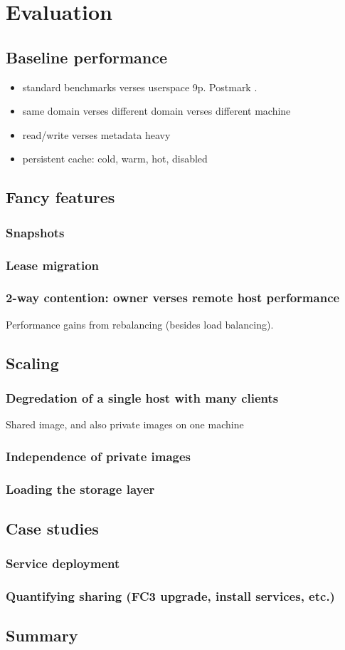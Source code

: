 \chapter{Evaluation}

\section{Baseline performance}
\begin{itemize}
\item standard benchmarks verses userspace 9p. Postmark \cite{katcher}.
\item same domain verses different domain verses different machine
\item read/write verses metadata heavy
\item persistent cache: cold, warm, hot, disabled
\end{itemize}

\section{Fancy features}
\subsection{Snapshots}
\subsection{Lease migration}
\subsection{2-way contention: owner verses remote host performance}
Performance gains from rebalancing (besides load balancing).

\section{Scaling}
\subsection{Degredation of a single host with many clients}
Shared image, and also private images on one machine
\subsection{Independence of private images}
\subsection{Loading the storage layer}

\section{Case studies}
\subsection{Service deployment}
\subsection{Quantifying sharing (FC3 upgrade, install services, etc.)}

\section{Summary}